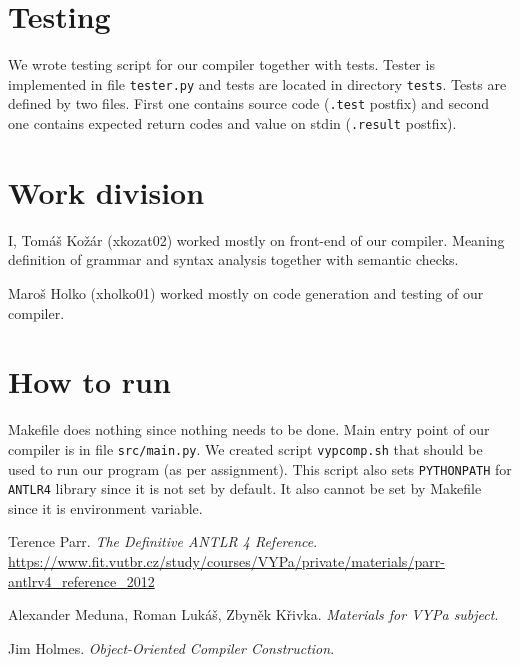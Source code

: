 \documentclass[a4paper, 11pt]{article}
\begin{document}
\section{Testing}
We wrote testing script for our compiler together with tests. Tester is implemented in file \texttt{tester.py} and tests are located in directory \texttt{tests}. Tests are defined by two files. First one contains source code (\texttt{.test} postfix) and second one contains expected return codes and value on stdin (\texttt{.result} postfix).

\section{Work division}
I, Tomáš Kožár (xkozat02) worked mostly on front-end of our compiler. Meaning definition of grammar and syntax analysis together with semantic checks.

Maroš Holko (xholko01) worked mostly on code generation and testing of our compiler.

\section{How to run}
Makefile does nothing since nothing needs to be done.
Main entry point of our compiler is in file \texttt{src/main.py}. We created script \texttt{vypcomp.sh} that should be used to run our program (as per assignment). This script also sets \texttt{PYTHONPATH} for \texttt{ANTLR4} library since it is not set by default. It also cannot be set by Makefile since it is environment variable.


\begin{thebibliography}{}

Terence Parr.
\textit{The Definitive ANTLR 4 Reference}.\\
\url{https://www.fit.vutbr.cz/study/courses/VYPa/private/materials/parr-antlrv4_reference_2012}

Alexander Meduna, Roman Lukáš, Zbyněk Křivka.
\textit{Materials for VYPa subject}.

Jim Holmes.
\textit{Object-Oriented Compiler Construction}.

\end{thebibliography}
\end{document}

